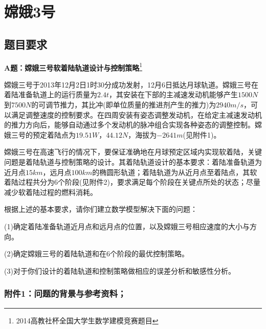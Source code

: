 % 
\chapter{嫦娥3号}
\section{题目要求}
    \par
    \textbf{A题：嫦娥三号软着陆轨道设计与控制策略}\footnote{2014高教社杯全国大学生数学建模竞赛题目}
    \par
    嫦娥三号于2013年12月2日1时30分成功发射，12月6日抵达月球轨道。嫦娥三号在着陆准备轨道上的运行质量为$2.4t$，其安装在下部的主减速发动机能够产生$1500N$到$7500N$的可调节推力，其比冲(即单位质量的推进剂产生的推力)为$2940m/s$，可以满足调整速度的控制要求。在四周安装有姿态调整发动机，在给定主减速发动机的推力方向后，能够自动通过多个发动机的脉冲组合实现各种姿态的调整控制。嫦娥三号的预定着陆点为$19.51W$，$44.12N$，海拔为$-2641m$(见附件1)。
    \par
    嫦娥三号在高速飞行的情况下，要保证准确地在月球预定区域内实现软着陆，关键问题是着陆轨道与控制策略的设计。其着陆轨道设计的基本要求：着陆准备轨道为近月点$15km$，远月点$100km$的椭圆形轨道；着陆轨道为从近月点至着陆点，其软着陆过程共分为6个阶段(见附件2)，要求满足每个阶段在关键点所处的状态；尽量减少软着陆过程的燃料消耗。
    \par
    根据上述的基本要求，请你们建立数学模型解决下面的问题：
    \par
    (1)确定着陆准备轨道近月点和远月点的位置，以及嫦娥三号相应速度的大小与方向。
    \par
    (2)确定嫦娥三号的着陆轨道和在6个阶段的最优控制策略。
    \par
    (3)对于你们设计的着陆轨道和控制策略做相应的误差分析和敏感性分析。
    \subsection{附件1：问题的背景与参考资料；}

